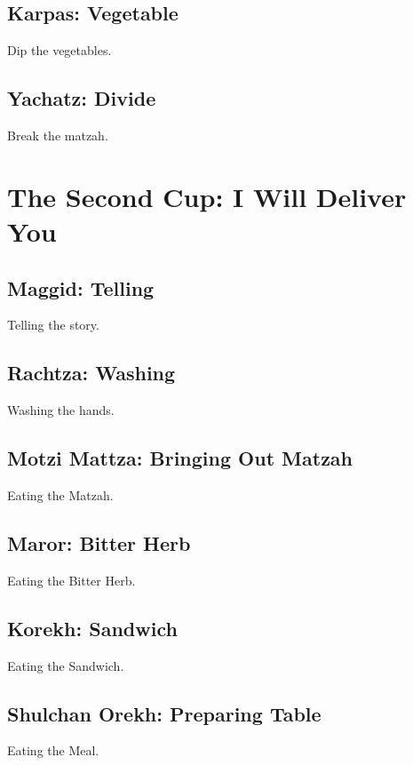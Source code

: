 \documentclass[10pt,oneside,footinclude=true,headinclude=true]{scrbook} %
\begin{document}


\chapter{Karpas: Vegetable}
Dip the vegetables.

\chapter{Yachatz: Divide}
Break the matzah.


\part{The Second Cup: I Will Deliver You}

\chapter{Maggid: Telling}
Telling the story.

\chapter{Rachtza: Washing}
Washing the hands.

\chapter{Motzi Mattza: Bringing Out Matzah}
Eating the Matzah.

\chapter{Maror: Bitter Herb}
Eating the Bitter Herb.

\chapter{Korekh: Sandwich}
Eating the Sandwich.

\chapter{Shulchan Orekh: Preparing Table}
Eating the Meal.
\end{document}
